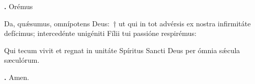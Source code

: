 \textbf{\Vbar.} Orémus

Da, qu\'{\ae}sumus, omnípotens Deus:~† ut qui in tot advérsis ex nostra infirmitáte defícimus; intercedénte unigéniti Fílii tui passióne respirémus:

Qui tecum vivit et regnat in unitáte Spíritus Sancti Deus per ómnia s\'{\ae}cula sæculórum.

\textbf{\Rbar.} Amen.

